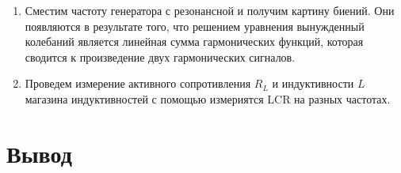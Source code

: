 \documentclass[14pt, a4paper]{report}
\begin{document}
\begin{enumerate}
\item Сместим частоту генератора с резонансной и получим картину биений. Они появляются в результате того, что решением уравнения вынужденный колебаний является линейная сумма гармонических функций, которая сводится к произведение двух гармонических сигналов.

\item Проведем измерение активного сопротивления $R_L$ и индуктивности $L$ магазина индуктивностей с помощью измериятся LCR на разных частотах.

\begin{table}[H]
\centering
{}
\caption{Результаты измерения активного сопротивления и индуктивности магазина индуктивностей}
\end{table}

\end{enumerate}

\section{Вывод}

\begin{table}[H]
\centering
{}
\caption{Итоговая таблица}
\end{table}
\end{document}
